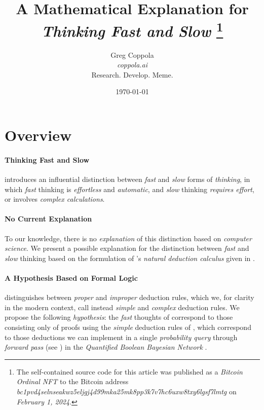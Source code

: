 \documentclass[11pt]{article}
\begin{document}
\newcommand{\aset}{{\bf A}}
\newcommand{\cset}{{\bf C}}
\newcommand{\dset}{{\bf d}}
\title{\bf A Mathematical Explanation for\\
{\em Thinking Fast and Slow}
\thanks{The self-contained source code for this article was published as a {\em Bitcoin Ordinal NFT} to the Bitcoin address {\em bc1pvd4selnseakwz5eljgj4d99mka25mk8pp3k7v7hc6uxw8txy6lgsf7lmtg} on {\em February 1, 2024}.}
}
\author{
    {\Large Greg Coppola}
    \\
    {\em coppola.ai} \\
    Research. Develop. Meme.
}
\date{\today}

\maketitle

\section*{Overview}
\paragraph{Thinking Fast and Slow}
\cite{Kahneman2011ThinkingFast} introduces an influential distinction between {\em fast} and {\em slow} forms of {\em thinking},
in which {\em fast} thinking is {\em effortless} and {\em automatic}, and {\em slow} thinking {\em requires effort}, or involves {\em complex calculations}.
\paragraph{No Current Explanation}
To our knowledge, there is no {\em explanation} of this distinction based on {\em computer science}.
We present a possible explanation for the distinction between {\em fast} and {\em slow} thinking based on the formulation of \cite{Gentzen1934}'s {\em natural deduction calculus} given in \cite{PrawitzNaturalDeduction}.
\paragraph{A Hypothesis Based on Formal Logic}
\cite{PrawitzNaturalDeduction} distinguishes between {\em proper} and {\em improper} deduction rules, which we, for clarity in the modern context, call instead {\em simple} and {\em complex} deduction rules.
We propose the following {\em hypothesis}: the {\em fast} thoughts of \cite{Kahneman2011ThinkingFast} correspond to those consisting only of proofs using the {\em simple} deduction rules of \cite{PrawitzNaturalDeduction}, which correspond to those deductions we can implement in a single {\em probability query} through {\em forward pass} (see \cite{koller2009probabilistic}) in the {\em Quantified Boolean Bayesian Network} \cite{Coppola2024}.
\end{document}
